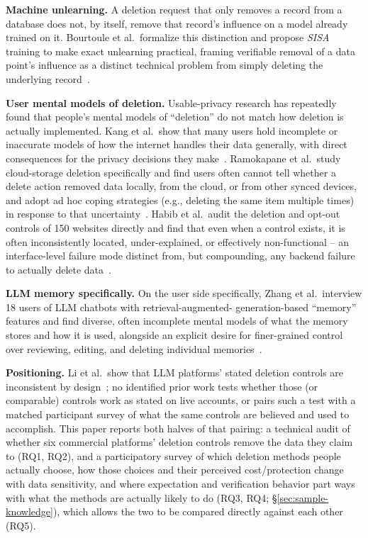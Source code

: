 \documentclass[conference,compsoc]{IEEEtran}
\begin{document}
\textbf{Machine unlearning.} A deletion request that only removes a
record from a database does not, by itself, remove that record's
influence on a model already trained on it. Bourtoule et al.\ formalize
this distinction and propose \textit{SISA} training to make exact
unlearning practical, framing verifiable removal of a data point's
influence as a distinct technical problem from simply deleting the
underlying record~\cite{bourtoule2021machine}.

\textbf{User mental models of deletion.} Usable-privacy research has
repeatedly found that people's mental models of ``deletion'' do not
match how deletion is actually implemented. Kang et al.\ show that many
users hold incomplete or inaccurate models of how the internet handles
their data generally, with direct consequences for the privacy decisions
they make~\cite{kang2015mydata}. Ramokapane et al.\ study cloud-storage
deletion specifically and find users often cannot tell whether a delete
action removed data locally, from the cloud, or from other synced
devices, and adopt ad hoc coping strategies (e.g., deleting the same
item multiple times) in response to that uncertainty~\cite{ramokapane2017stupid}.
Habib et al.\ audit the deletion and opt-out controls of 150 websites
directly and find that even when a control exists, it is often
inconsistently located, under-explained, or effectively non-functional --
an interface-level failure mode distinct from, but compounding, any
backend failure to actually delete data~\cite{habib2019empirical}.

\textbf{LLM memory specifically.} On the user side specifically, Zhang
et al.\ interview 18 users of LLM chatbots with retrieval-augmented-
generation-based ``memory'' features and find diverse, often incomplete
mental models of what the memory stores and how it is used, alongside an
explicit desire for finer-grained control over reviewing, editing, and
deleting individual memories~\cite{zhang2025understanding}.

\textbf{Positioning.} Li et al.\ show that LLM platforms' stated
deletion controls are inconsistent by design~\cite{li2026privacy}; no
identified prior work tests whether those (or comparable) controls
work as stated on live accounts, or pairs such a test with a matched
participant survey of what the same controls are believed and used to
accomplish. This paper reports both halves of that pairing: a technical
audit of whether six commercial platforms' deletion controls remove the
data they claim to (RQ1, RQ2), and a participatory survey of which
deletion methods people actually choose, how those choices and their
perceived cost/protection change with data sensitivity, and where
expectation and verification behavior part ways with what the methods
are actually likely to do (RQ3, RQ4;
\S\ref{sec:sample-knowledge}), which allows the two to be compared directly
against each other (RQ5).
\end{document}
